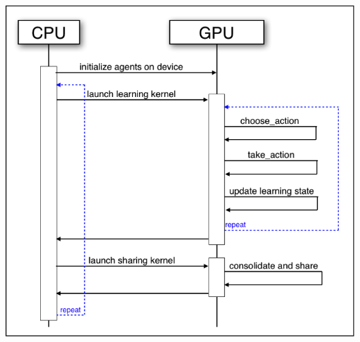 \documentclass[11pt]{article} %
\begin{document}
\center
\includegraphics[scale=0.8]{fig01}
\end{document}
